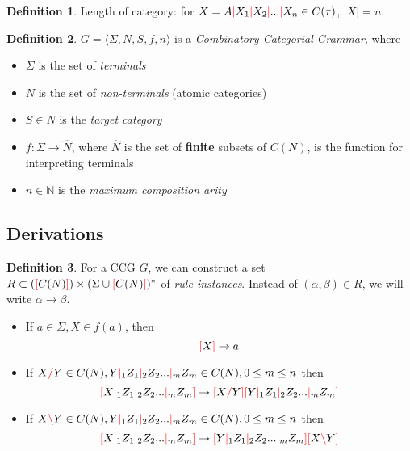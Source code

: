 \documentclass[12pt]{extarticle}
\theoremstyle{definition} \newtheorem{defn}{Definition}
\theoremstyle{definition} \newtheorem{prop}{Proposition}
\newcommand{\lc}{\textcolor{red}{\backslash}}
\newcommand{\rc}{\textcolor{red}{/}}
\newcommand{\mc}{\textcolor{red}{|}}
\newcommand{\lb}{\textcolor{red}{[}}
\newcommand{\rb}{\textcolor{red}{]}}
\begin{document}
\begin{defn}
    Length of category: for $X = A \mc X_1 \mc X_2 \mc ... \mc X_n \in C(\tau)$,
    $|X| = n$.
\end{defn}

\begin{defn}
    $ G = \langle \Sigma, N, S, f, n \rangle $ is a \emph{Combinatory Categorial Grammar}, where
    \begin{itemize}
        \item $ \Sigma $ is the set of \emph{terminals}
        \item $ N $ is the set of \emph{non-terminals} (atomic categories)
        \item $ S \in N $ is the \emph{target category}
        \item $ f : \Sigma \rightarrow \hat{N} $, where $\hat{N}$ is the set of
            \textbf{finite} subsets of $C(N)$, is the function for interpreting
            terminals
        \item $ n \in \mathbb{N} $ is the \emph{maximum composition arity}
    \end{itemize}
\end{defn}

\subsection{Derivations}

\begin{defn}
    For a CCG $G$, we can construct a set $R \subset (\lb C(N) \rb) \times (\Sigma \cup \lb C(N) \rb)^*$
    of \emph{rule instances}. Instead of $(\alpha, \beta) \in R$, we will write
    $\alpha \rightarrow \beta$.

    \begin{itemize}
        \item If $ a \in \Sigma, X \in f(a) $, then \[ \lb X \rb \rightarrow a \]
        \item If $ X \rc Y \in C(N), Y \mc_1 Z_1 \mc_2 Z_2 ... \mc_m Z_m \in C(N), 0 \leq m \leq n $
            then \[ \lb X \mc_1 Z_1 \mc_2 Z_2 ... \mc_m Z_m \rb \rightarrow \lb X \rc Y \rb \lb Y \mc_1 Z_1 \mc_2 Z_2 ... \mc_m Z_m \rb \]
        \item If $ X \lc Y \in C(N), Y \mc_1 Z_1 \mc_2 Z_2 ... \mc_m Z_m \in C(N), 0 \leq m \leq n $
            then \[ \lb X \mc_1 Z_1 \mc_2 Z_2 ... \mc_m Z_m \rb \rightarrow \lb Y \mc_1 Z_1 \mc_2 Z_2 ... \mc_m Z_m \rb \lb X \lc Y \rb \]
    \end{itemize}
\end{defn}
\end{document}
